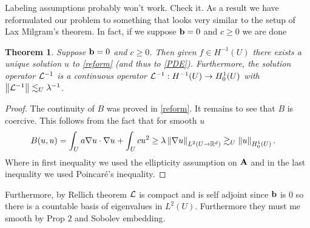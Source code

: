 \documentclass[12pt]{article}
\newtheorem{theorem}{Theorem}[section]
\theoremstyle{definition}
\newcommand{\red}[1]{{\color{red}#1}}
\renewcommand{\norm}[1]{\left\lVert #1 \right\rVert}\renewcommand{\abs}[1]{\left| #1 \right|}
\begin{document}
\red{Labeling assumptions probably won't work. Check it.}
As a result we have reformulated our problem to something that looks very similar to the setup of Lax Milgram's theorem. In fact, if we suppose $\vb{b}=0$ and $c \geq 0$ we are done
\begin{theorem}
	Suppose $\vb{b}=0$  and $c \geq 0$. Then given $f \in  H^{-1}(U)$ there exists a unique solution $u$ to \eqref{reform} (and thus to \eqref{PDE}). Furthermore, the solution operator $\mathcal{L}^{-1}$ is a continuous operator	 $\mathcal{L}^{-1}: H^{-1}(U) \to H^1_0(U)$ with $\norm{\Ll^{-1}} \lesssim_U \lambda ^{-1}$.
\end{theorem}
\begin{proof}
	The continuity of $B$ was proved in  \eqref{reform}. It remains to see that $B$ is coercive. This follows from the fact that for smooth $u$
	\begin{align}\label{b=0}
		B(u,u) & = \int_{U}a \nabla u \cdot \nabla u + \int_{U} cu^2 \geq \lambda \norm{\nabla u}_{L^2(U \to \R^d)} \gtrsim_U \norm{u}_{H^1_0(U)}.
	\end{align}
	Where in first inequality we used the ellipticity assumption on $\vb{A}$ and in the last inequality we used Poincaré's inequality.
\end{proof}
Furthermore, by Rellich theorem $\mathcal{L}$ is compact and is self adjoint since $\vb{b}$ is  $0$ so there is a countable basis of eigenvalues in  $L^2(U)$. Furthermore they must me smooth by Prop  $2$ and Sobolev embedding.
\end{document}
